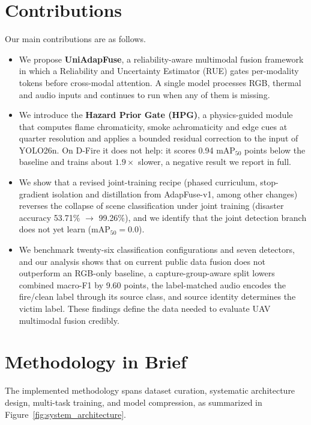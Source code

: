 \section{Contributions}

Our main contributions are as follows.

\begin{itemize}
    \item We propose \textbf{UniAdapFuse}, a reliability-aware multimodal fusion framework in which a Reliability and Uncertainty Estimator (RUE) gates per-modality tokens before cross-modal attention. A single model processes RGB, thermal and audio inputs and continues to run when any of them is missing.
    \item We introduce the \textbf{Hazard Prior Gate (HPG)}, a physics-guided module that computes flame chromaticity, smoke achromaticity and edge cues at quarter resolution and applies a bounded residual correction to the input of YOLO26n. On D-Fire it does not help: it scores 0.94 $\mathrm{mAP}_{50}$ points below the baseline and trains about $1.9\times$ slower, a negative result we report in full.
    \item We show that a revised joint-training recipe (phased curriculum, stop-gradient isolation and distillation from AdapFuse-v1, among other changes) reverses the collapse of scene classification under joint training (disaster accuracy 53.71\% $\to$ 99.26\%), and we identify that the joint detection branch does not yet learn ($\mathrm{mAP}_{50}=0.0$).
    \item We benchmark twenty-six classification configurations and seven detectors, and our analysis shows that on current public data fusion does not outperform an RGB-only baseline, a capture-group-aware split lowers combined macro-F1 by 9.60 points, the label-matched audio encodes the fire/clean label through its source class, and source identity determines the victim label. These findings define the data needed to evaluate UAV multimodal fusion credibly.
\end{itemize}

\section{Methodology in Brief}

The implemented methodology spans dataset curation, systematic architecture design, multi-task training, and model compression, as summarized in Figure~\ref{fig:system_architecture}.

